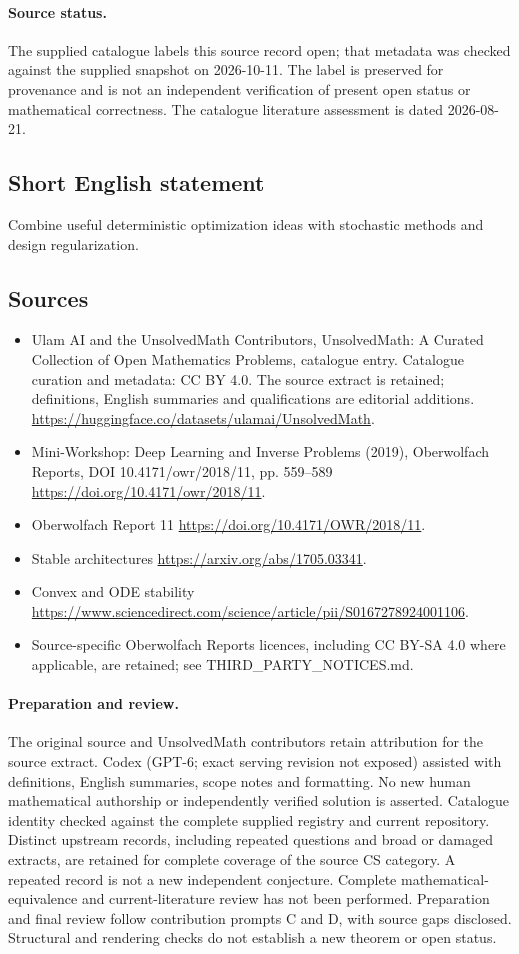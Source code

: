 \documentclass[11pt]{article}
\begin{document}
\paragraph{Source status.}
The supplied catalogue labels this source record open; that metadata was checked against the supplied snapshot on 2026-10-11. The label is preserved for provenance and is not an independent verification of present open status or mathematical correctness. The catalogue literature assessment is dated 2026-08-21.
\subsection{Short English statement}
Combine useful deterministic optimization ideas with stochastic methods and design regularization.
\subsection{Sources}
\begin{itemize}
\item[S1] Ulam AI and the UnsolvedMath Contributors, UnsolvedMath: A Curated Collection of Open Mathematics Problems, catalogue entry. Catalogue curation and metadata: CC BY 4.0. The source extract is retained; definitions, English summaries and qualifications are editorial additions.
\url{https://huggingface.co/datasets/ulamai/UnsolvedMath}.
\item[S2] Mini-Workshop: Deep Learning and Inverse Problems (2019), Oberwolfach Reports, DOI 10.4171/owr/2018/11, pp. 559--589
\url{https://doi.org/10.4171/owr/2018/11}.
\item[S3] Oberwolfach Report 11
\url{https://doi.org/10.4171/OWR/2018/11}.
\item[S4] Stable architectures
\url{https://arxiv.org/abs/1705.03341}.
\item[S5] Convex and ODE stability
\url{https://www.sciencedirect.com/science/article/pii/S0167278924001106}.
\item Source-specific Oberwolfach Reports licences, including CC BY-SA 4.0 where applicable, are retained; see THIRD\_PARTY\_NOTICES.md.
\end{itemize}
\paragraph{Preparation and review.}
The original source and UnsolvedMath contributors retain attribution for the source extract. Codex (GPT-6; exact serving revision not exposed) assisted with definitions, English summaries, scope notes and formatting. No new human mathematical authorship or independently verified solution is asserted. Catalogue identity checked against the complete supplied registry and current repository. Distinct upstream records, including repeated questions and broad or damaged extracts, are retained for complete coverage of the source CS category. A repeated record is not a new independent conjecture. Complete mathematical-equivalence and current-literature review has not been performed. Preparation and final review follow contribution prompts C and D, with source gaps disclosed. Structural and rendering checks do not establish a new theorem or open status.
\label{end:statement}
\end{document}
